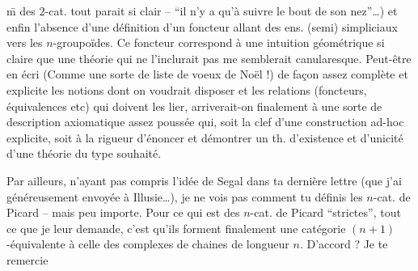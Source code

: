 \={m} des $2$-cat. tout parait si clair -- ``il n'y a qu'à suivre le bout de son nez''\dots) et enfin l'absence d'une définition d'un foncteur allant des ens. (semi) simpliciaux vers les $n$-groupoïdes. Ce foncteur correspond à une intuition géométrique si claire que une théorie qui ne l'inclurait pas me semblerait canularesque. Peut-être en écri (Comme\unsure{:} une sorte de liste de voeux de Noël !) de façon assez complète et explicite les  notions dont on voudrait disposer et les relations (foncteurs, équivalences etc) qui doivent les lier, arriverait-on finalement à une sorte de description axiomatique assez poussée qui, soit  la clef d'une construction ad-hoc explicite, soit  à la rigueur d'énoncer et démontrer un th. d'existence et d'unicité d'une théorie du type souhaité.

Par ailleurs, n'ayant pas compris l'idée de Segal dans ta dernière lettre (que j'ai généreusement envoyée à Illusie\dots), je ne vois pas comment tu définis les $n$-cat. de Picard -- mais peu importe. Pour ce qui est des $n$-cat. de Picard ``strictes'', tout ce que je leur demande, c'est qu'ils forment finalement une catégorie $(n+1)$-équivalente à celle des complexes de chaines de longueur $n$. D'accord ? Je te remercie
